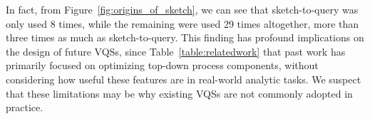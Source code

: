 In fact, from Figure~\ref{fig:origins_of_sketch},
we can see that sketch-to-query was only used
8 times, while the remaining  were used 29 times altogether,
more than three times as much as sketch-to-query.
This finding has profound implications
on the design of future VQSs, since Table~\ref{table:relatedwork}
 that past work has primarily focused
on optimizing top-down process components,
without considering how useful these features
are in real-world analytic tasks.
We suspect that these limitations
may be why existing VQSs are not commonly adopted in practice. %

